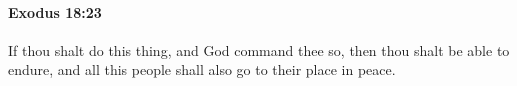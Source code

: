 
		\paragraph{Exodus 18:23} %
			\label{EXODUS-18-23}

			If thou shalt do this thing, and God command thee so, then thou shalt be able to endure, and all this people shall also go to their place in peace.


